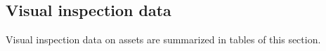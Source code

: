 %	

\subsection{Visual inspection data}
Visual inspection data on assets are summarized in tables of this section. %

